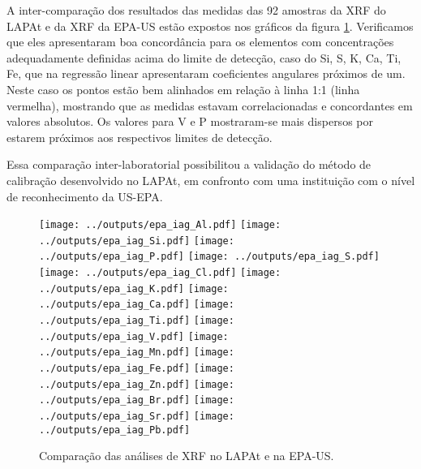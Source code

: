 A inter-comparação dos resultados das medidas das 92 amostras da XRF do LAPAt e 
da XRF da EPA-US estão expostos nos gráficos da figura \ref{fig:epa_lapat}. 
Verificamos que eles apresentaram boa concordância para os elementos com 
concentrações adequadamente definidas acima do limite de detecção, caso do Si, 
S, K, Ca, Ti, Fe, que na regressão linear apresentaram coeficientes angulares 
próximos de um. Neste caso os pontos estão bem alinhados em relação à 
linha 1:1 (linha vermelha), mostrando que as medidas estavam correlacionadas e 
concordantes em valores absolutos.
Os valores para V e P mostraram-se mais dispersos por estarem próximos aos 
respectivos limites de detecção.
 
Essa comparação inter-laboratorial possibilitou a validação do método de 
calibração desenvolvido no LAPAt, em confronto com uma instituição com o nível 
de reconhecimento da US-EPA.

\newpage
\begin{figure}[H]
  \centering
    \texttt{[image: ../outputs/epa\_iag\_Al.pdf]}
    \texttt{[image: ../outputs/epa\_iag\_Si.pdf]}
    \texttt{[image: ../outputs/epa\_iag\_P.pdf]}
    \texttt{[image: ../outputs/epa\_iag\_S.pdf]}
    \texttt{[image: ../outputs/epa\_iag\_Cl.pdf]}
    \texttt{[image: ../outputs/epa\_iag\_K.pdf]}
    \texttt{[image: ../outputs/epa\_iag\_Ca.pdf]}
    \texttt{[image: ../outputs/epa\_iag\_Ti.pdf]}
    \texttt{[image: ../outputs/epa\_iag\_V.pdf]}
    \texttt{[image: ../outputs/epa\_iag\_Mn.pdf]}
    \texttt{[image: ../outputs/epa\_iag\_Fe.pdf]}
    \texttt{[image: ../outputs/epa\_iag\_Zn.pdf]}
    \texttt{[image: ../outputs/epa\_iag\_Br.pdf]}
    \texttt{[image: ../outputs/epa\_iag\_Sr.pdf]}
    \texttt{[image: ../outputs/epa\_iag\_Pb.pdf]}
  \caption{Comparação das análises de XRF no LAPAt e na EPA-US. 
           \label{fig:epa_lapat}}
\end{figure}
